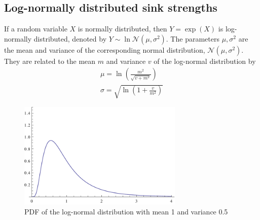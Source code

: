 \subsection{Log-normally distributed sink strengths}
If a random variable \(X\) is normally distributed, then \(Y=\exp(X)\) is
log-normally distributed, denoted by \(Y\sim\ln\mathcal{N}(\mu,\sigma^2)\). The
parameters \(\mu,\sigma^2\) are the mean and variance of the corresponding
normal distribution, \(\mathcal{N}(\mu,\sigma^2)\). They are related to the mean
\(m\) and variance \(v\) of the log-normal distribution by
\begin{gather*}
    \mu = \ln\left(\frac{m^2}{\sqrt{v+m^2}}\right)\\
    \sigma = \sqrt{\ln\left(1+\frac{v}{m^2}\right)}
\end{gather*}

\begin{figure}[ht!]
    \centering
    \includegraphics[width=0.7\textwidth]{continuum/figures/log_normal_pdf}
    \caption{\label{fig:log_normal_pdf}PDF of the log-normal distribution with mean 1 and variance 0.5}
\end{figure}

\FloatBarrier

